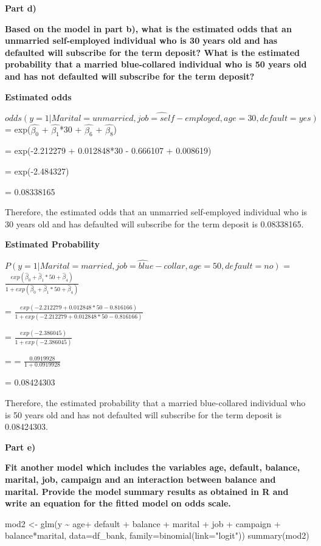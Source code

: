 \documentclass[
]{article}
\newenvironment{Shaded}{\begin{snugshade}}{\end{snugshade}}
\newcommand{\AttributeTok}[1]{\textcolor[rgb]{0.77,0.63,0.00}{#1}}
\newcommand{\FunctionTok}[1]{\textcolor[rgb]{0.00,0.00,0.00}{#1}}
\newcommand{\NormalTok}[1]{#1}
\newcommand{\OtherTok}[1]{\textcolor[rgb]{0.56,0.35,0.01}{#1}}
\newcommand{\SpecialCharTok}[1]{\textcolor[rgb]{0.00,0.00,0.00}{#1}}
\newcommand{\StringTok}[1]{\textcolor[rgb]{0.31,0.60,0.02}{#1}}
\begin{document}
\textbf{Part d)}

\textbf{Based on the model in part b), what is the estimated odds that
an unmarried self-employed individual who is 30 years old and has
defaulted will subscribe for the term deposit? What is the estimated
probability that a married blue-collared individual who is 50 years old
and has not defaulted will subscribe for the term deposit?}

\textbf{Estimated odds}

\(\hat{odds(y=1|Marital=unmarried, job=self-employed, age=30, default=yes)}\)
= exp(\(\hat{\beta_0}\) + \(\hat{\beta_1}\)*30 + \(\hat{\beta_6}\) +
\(\hat{\beta_8}\))

= exp(-2.212279 + 0.012848*30 - 0.666107 + 0.008619)

= exp(-2.484327)

= 0.08338165

Therefore, the estimated odds that an unmarried self-employed individual
who is 30 years old and has defaulted will subscribe for the term
deposit is 0.08338165.

\textbf{Estimated Probability}

\(\hat{P(y=1|Marital=married, job=blue-collar, age=50, default=no)}\) =
\(\frac{exp(\hat\beta_0+\hat\beta_1*50+\hat\beta_4)}{1+exp(\hat\beta_0+\hat\beta_1*50+\hat\beta_4)}\)

=
\(\frac{exp(-2.212279+0.012848*50-0.816166)}{1+exp(-2.212279+0.012848*50-0.816166)}\)

= \(\frac{exp(-2.386045)}{1+exp(-2.386045)}\)

= = \(\frac{0.0919928}{1+0.0919928}\)

= 0.08424303

Therefore, the estimated probability that a married blue-collared
individual who is 50 years old and has not defaulted will subscribe for
the term deposit is 0.08424303.

\textbf{Part e)}

\textbf{Fit another model which includes the variables age, default,
balance, marital, job, campaign and an interaction between balance and
marital. Provide the model summary results as obtained in R and write an
equation for the fitted model on odds scale.}

\begin{Shaded}
\begin{Highlighting}[]
\NormalTok{mod2 }\OtherTok{\textless{}{-}} \FunctionTok{glm}\NormalTok{(y }\SpecialCharTok{\textasciitilde{}}\NormalTok{ age}\SpecialCharTok{+}\NormalTok{ default }\SpecialCharTok{+}\NormalTok{ balance }\SpecialCharTok{+}\NormalTok{ marital }\SpecialCharTok{+}\NormalTok{ job }\SpecialCharTok{+}\NormalTok{ campaign }\SpecialCharTok{+}\NormalTok{ balance}\SpecialCharTok{*}\NormalTok{marital, }\AttributeTok{data=}\NormalTok{df\_bank,}
          \AttributeTok{family=}\FunctionTok{binomial}\NormalTok{(}\AttributeTok{link=}\StringTok{"logit"}\NormalTok{))}
\FunctionTok{summary}\NormalTok{(mod2)}
\end{Highlighting}
\end{Shaded}
\end{document}

